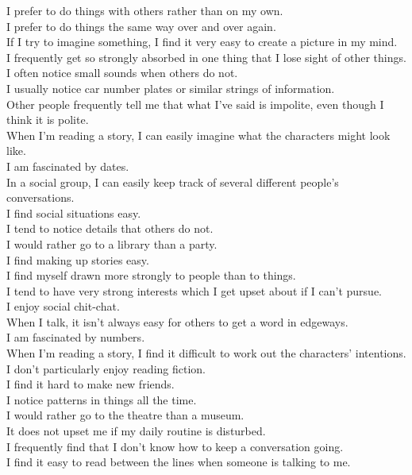 \documentclass[a4paper, 11pt]{article}
\begin{document}
I prefer to do things with others rather than on my own.\\
I prefer to do things the same way over and over again.\\
If I try to imagine something, I find it very easy to create a picture in my mind.\\
I frequently get so strongly absorbed in one thing that I lose sight of other things.\\
I often notice small sounds when others do not.\\
I usually notice car number plates or similar strings of information.\\
Other people frequently tell me that what I've said is impolite, even though I think it is polite.\\
When I'm reading a story, I can easily imagine what the characters might look like.\\
I am fascinated by dates.\\
In a social group, I can easily keep track of several different people's conversations.\\
I find social situations easy.\\
I tend to notice details that others do not.\\
I would rather go to a library than a party.\\
I find making up stories easy.\\
I find myself drawn more strongly to people than to things.\\
I tend to have very strong interests which I get upset about if I can't pursue.\\
I enjoy social chit-chat.\\
When I talk, it isn't always easy for others to get a word in edgeways.\\
I am fascinated by numbers.\\
When I'm reading a story, I find it difficult to work out the characters' intentions.\\
I don't particularly enjoy reading fiction.\\
I find it hard to make new friends.\\
I notice patterns in things all the time.\\
I would rather go to the theatre than a museum.\\
It does not upset me if my daily routine is disturbed.\\
I frequently find that I don't know how to keep a conversation going.\\
I find it easy to read between the lines when someone is talking to me.\\
\end{document}
